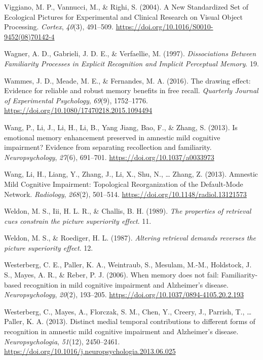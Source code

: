 \documentclass[
  11pt,
]{article}
\begin{document}
\leavevmode\hypertarget{ref-viggiano2004}{}%
Viggiano, M. P., Vannucci, M., \& Righi, S. (2004). A New Standardized
Set of Ecological Pictures for Experimental and Clinical Research on
Visual Object Processing. \emph{Cortex}, \emph{40}(3), 491--509.
\url{https://doi.org/10.1016/S0010-9452(08)70142-4}

\leavevmode\hypertarget{ref-wagner1997}{}%
Wagner, A. D., Gabrieli, J. D. E., \& Verfaellie, M. (1997).
\emph{Dissociations Between Familiarity Processes in Explicit
Recognition and Implicit Perceptual Memory}. 19.

\leavevmode\hypertarget{ref-wammes2016}{}%
Wammes, J. D., Meade, M. E., \& Fernandes, M. A. (2016). The drawing
effect: Evidence for reliable and robust memory benefits in free recall.
\emph{Quarterly Journal of Experimental Psychology}, \emph{69}(9),
1752--1776. \url{https://doi.org/10.1080/17470218.2015.1094494}

\leavevmode\hypertarget{ref-wang2013a}{}%
Wang, P., Li, J., Li, H., Li, B., Yang Jiang, Bao, F., \& Zhang, S.
(2013). Is emotional memory enhancement preserved in amnestic mild
cognitive impairment? Evidence from separating recollection and
familiarity. \emph{Neuropsychology}, \emph{27}(6), 691--701.
\url{https://doi.org/10.1037/a0033973}

\leavevmode\hypertarget{ref-wang2013}{}%
Wang, Li, H., Liang, Y., Zhang, J., Li, X., Shu, N., \ldots{} Zhang, Z.
(2013). Amnestic Mild Cognitive Impairment: Topological Reorganization
of the Default-Mode Network. \emph{Radiology}, \emph{268}(2), 501--514.
\url{https://doi.org/10.1148/radiol.13121573}

\leavevmode\hypertarget{ref-weldon1989}{}%
Weldon, M. S., Iii, H. L. R., \& Challis, B. H. (1989). \emph{The
properties of retrieval cues constrain the picture superiority effect}.
11.

\leavevmode\hypertarget{ref-weldon1987}{}%
Weldon, M. S., \& Roediger, H. L. (1987). \emph{Altering retrieval
demands reverses the picture superiority effect}. 12.

\leavevmode\hypertarget{ref-westerberg2006}{}%
Westerberg, C. E., Paller, K. A., Weintraub, S., Mesulam, M.-M.,
Holdstock, J. S., Mayes, A. R., \& Reber, P. J. (2006). When memory does
not fail: Familiarity-based recognition in mild cognitive impairment and
Alzheimer's disease. \emph{Neuropsychology}, \emph{20}(2), 193--205.
\url{https://doi.org/10.1037/0894-4105.20.2.193}

\leavevmode\hypertarget{ref-westerberg2013}{}%
Westerberg, C., Mayes, A., Florczak, S. M., Chen, Y., Creery, J.,
Parrish, T., \ldots{} Paller, K. A. (2013). Distinct medial temporal
contributions to different forms of recognition in amnestic mild
cognitive impairment and Alzheimer's disease. \emph{Neuropsychologia},
\emph{51}(12), 2450--2461.
\url{https://doi.org/10.1016/j.neuropsychologia.2013.06.025}
\end{document}
